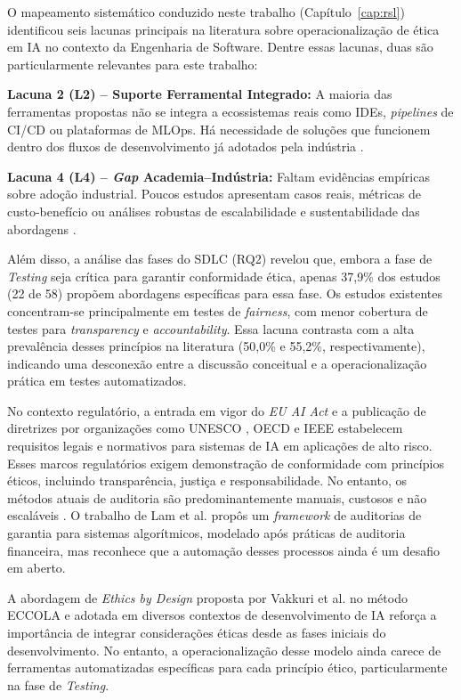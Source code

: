 O mapeamento sistemático conduzido neste trabalho (Capítulo~\ref{cap:rsl}) identificou seis lacunas principais na literatura sobre operacionalização de ética em IA no contexto da Engenharia de Software. Dentre essas lacunas, duas são particularmente relevantes para este trabalho:

\textbf{Lacuna 2 (L2) -- Suporte Ferramental Integrado:} A maioria das ferramentas propostas não se integra a ecossistemas reais como IDEs, \textit{pipelines} de CI/CD ou plataformas de MLOps. Há necessidade de soluções que funcionem dentro dos fluxos de desenvolvimento já adotados pela indústria \cite{S010, S021, S030}.

\textbf{Lacuna 4 (L4) -- \textit{Gap} Academia--Indústria:} Faltam evidências empíricas sobre adoção industrial. Poucos estudos apresentam casos reais, métricas de custo-benefício ou análises robustas de escalabilidade e sustentabilidade das abordagens \cite{Holstein2019}.

Além disso, a análise das fases do SDLC (RQ2) revelou que, embora a fase de \textit{Testing} seja crítica para garantir conformidade ética, apenas 37,9\% dos estudos (22 de 58) propõem abordagens específicas para essa fase. Os estudos existentes \cite{S003, S004, S022, S034} concentram-se principalmente em testes de \textit{fairness}, com menor cobertura de testes para \textit{transparency} e \textit{accountability}. Essa lacuna contrasta com a alta prevalência desses princípios na literatura (50,0\% e 55,2\%, respectivamente), indicando uma desconexão entre a discussão conceitual e a operacionalização prática em testes automatizados.

No contexto regulatório, a entrada em vigor do \textit{EU AI Act} \cite{EUAIAct2024} e a publicação de diretrizes por organizações como UNESCO \cite{UNESCO2021}, OECD e IEEE estabelecem requisitos legais e normativos para sistemas de IA em aplicações de alto risco. Esses marcos regulatórios exigem demonstração de conformidade com princípios éticos, incluindo transparência, justiça e responsabilidade. No entanto, os métodos atuais de auditoria são predominantemente manuais, custosos e não escaláveis \cite{S014}. O trabalho de Lam et al. \cite{Lam2024} propôs um \textit{framework} de auditorias de garantia para sistemas algorítmicos, modelado após práticas de auditoria financeira, mas reconhece que a automação desses processos ainda é um desafio em aberto.

A abordagem de \textit{Ethics by Design} proposta por Vakkuri et al. \cite{S012, S013} no método ECCOLA e adotada em diversos contextos de desenvolvimento de IA reforça a importância de integrar considerações éticas desde as fases iniciais do desenvolvimento. No entanto, a operacionalização desse modelo ainda carece de ferramentas automatizadas específicas para cada princípio ético, particularmente na fase de \textit{Testing}.

